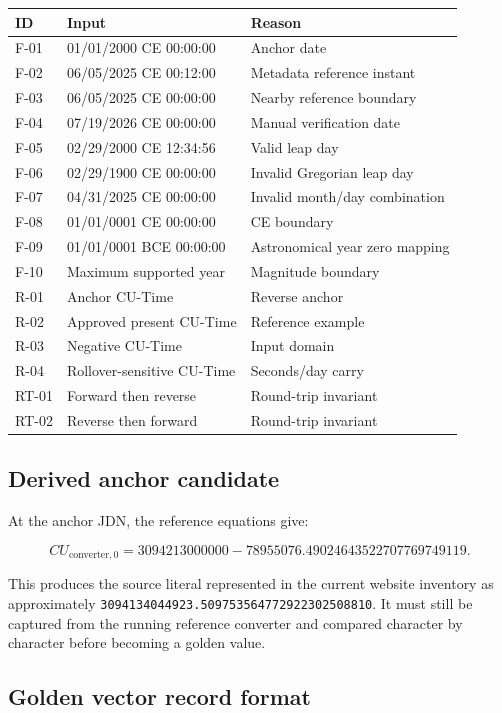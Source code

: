 \documentclass[11pt,letterpaper]{article}
\begin{document}
\begin{longtable}{L{0.55in}L{2.65in}L{2.9in}}
\toprule
\textbf{ID} & \textbf{Input} & \textbf{Reason} \\
\midrule
F-01 & 01/01/2000 CE 00:00:00 & Anchor date \\
F-02 & 06/05/2025 CE 00:12:00 & Metadata reference instant \\
F-03 & 06/05/2025 CE 00:00:00 & Nearby reference boundary \\
F-04 & 07/19/2026 CE 00:00:00 & Manual verification date \\
F-05 & 02/29/2000 CE 12:34:56 & Valid leap day \\
F-06 & 02/29/1900 CE 00:00:00 & Invalid Gregorian leap day \\
F-07 & 04/31/2025 CE 00:00:00 & Invalid month/day combination \\
F-08 & 01/01/0001 CE 00:00:00 & CE boundary \\
F-09 & 01/01/0001 BCE 00:00:00 & Astronomical year zero mapping \\
F-10 & Maximum supported year & Magnitude boundary \\
R-01 & Anchor CU-Time & Reverse anchor \\
R-02 & Approved present CU-Time & Reference example \\
R-03 & Negative CU-Time & Input domain \\
R-04 & Rollover-sensitive CU-Time & Seconds/day carry \\
RT-01 & Forward then reverse & Round-trip invariant \\
RT-02 & Reverse then forward & Round-trip invariant \\
\bottomrule
\end{longtable}

\subsection{Derived anchor candidate}

At the anchor JDN, the reference equations give:

\[
CU_{\mathrm{converter},0}
= 3094213000000
- 78955076.49024643522707769749119.
\]

This produces the source literal represented in the current website inventory
as approximately \nolinkurl{3094134044923.509753564772922302508810}. It must still
be captured from the running reference converter and compared character by
character before becoming a golden value.

\subsection{Golden vector record format}
\end{document}
